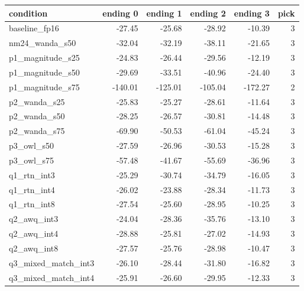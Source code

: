 \begin{tabular}{lrrrrr}
\toprule
condition & ending 0 & ending 1 & ending 2 & ending 3 & pick \\
\midrule
baseline\_fp16 & -27.45 & -25.68 & -28.92 & -10.39 & 3 \\
nm24\_wanda\_s50 & -32.04 & -32.19 & -38.11 & -21.65 & 3 \\
p1\_magnitude\_s25 & -24.83 & -26.44 & -29.56 & -12.19 & 3 \\
p1\_magnitude\_s50 & -29.69 & -33.51 & -40.96 & -24.40 & 3 \\
p1\_magnitude\_s75 & -140.01 & -125.01 & -105.04 & -172.27 & 2 \\
p2\_wanda\_s25 & -25.83 & -25.27 & -28.61 & -11.64 & 3 \\
p2\_wanda\_s50 & -28.25 & -26.57 & -30.81 & -14.48 & 3 \\
p2\_wanda\_s75 & -69.90 & -50.53 & -61.04 & -45.24 & 3 \\
p3\_owl\_s50 & -27.59 & -26.96 & -30.53 & -15.28 & 3 \\
p3\_owl\_s75 & -57.48 & -41.67 & -55.69 & -36.96 & 3 \\
q1\_rtn\_int3 & -25.29 & -30.74 & -34.79 & -16.05 & 3 \\
q1\_rtn\_int4 & -26.02 & -23.88 & -28.34 & -11.73 & 3 \\
q1\_rtn\_int8 & -27.54 & -25.60 & -28.95 & -10.25 & 3 \\
q2\_awq\_int3 & -24.04 & -28.36 & -35.76 & -13.10 & 3 \\
q2\_awq\_int4 & -28.88 & -25.81 & -27.02 & -14.93 & 3 \\
q2\_awq\_int8 & -27.57 & -25.76 & -28.98 & -10.47 & 3 \\
q3\_mixed\_match\_int3 & -26.10 & -28.44 & -31.80 & -16.82 & 3 \\
q3\_mixed\_match\_int4 & -25.91 & -26.60 & -29.95 & -12.33 & 3 \\
\bottomrule
\end{tabular}

